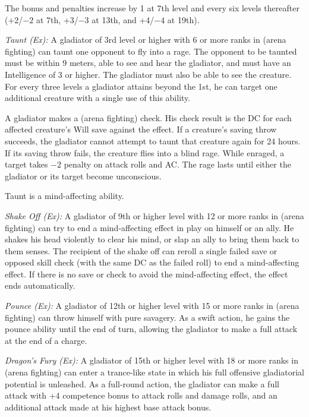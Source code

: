 The bonus and penalties increase by 1 at 7th level and every six levels thereafter (+2/$-2$ at 7th, +3/$-3$ at 13th, and +4/$-4$ at 19th).

\textit{Taunt (Ex):} A gladiator of 3rd level or higher with 6 or more ranks in  (arena fighting) can taunt one opponent to fly into a rage. The opponent to be taunted must be within 9 meters, able to see and hear the gladiator, and must have an Intelligence of 3 or higher. The gladiator must also be able to see the creature. For every three levels a gladiator attains beyond the 1st, he can target one additional creature with a single use of this ability.

A gladiator makes a  (arena fighting) check. His check result is the DC for each affected creature's Will save against the effect. If a creature's saving throw succeeds, the gladiator cannot attempt to taunt that creature again for 24 hours. If its saving throw fails, the creature flies into a blind rage. While enraged, a target takes $-2$ penalty on attack rolls and AC. The rage lasts until either the gladiator or its target become unconscious.

Taunt is a mind-affecting ability.

\textit{Shake Off (Ex):} A gladiator of 9th or higher level with 12 or more ranks in  (arena fighting) can try to end a mind-affecting effect in play on himself or an ally. He shakes his head violently to clear his mind, or slap an ally to bring them back to them senses. The recipient of the shake off can reroll a single failed save or opposed skill check (with the same DC as the failed roll) to end a mind-affecting effect. If there is no save or check to avoid the mind-affecting effect, the effect ends automatically.

\textit{Pounce (Ex):} A gladiator of 12th or higher level with 15 or more ranks in  (arena fighting) can throw himself with pure savagery. As a swift action, he gains the pounce ability until the end of turn, allowing the gladiator to make a full attack at the end of a charge.

\textit{Dragon's Fury (Ex):} A gladiator of 15th or higher level with 18 or more ranks in  (arena fighting) can enter a trance-like state in which his full offensive gladiatorial potential is unleashed. As a full-round action, the gladiator can make a full attack with +4 competence bonus to attack rolls and damage rolls, and an additional attack made at his highest base attack bonus.

